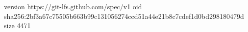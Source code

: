 version https://git-lfs.github.com/spec/v1
oid sha256:2bf3a67c75505b663b99c131056274ccd51a44e21b8c7cdef1d0bd298180479d
size 4471

